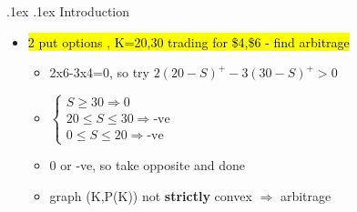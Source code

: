 \documentclass[10pt,landscape,a4paper]{article}
\makeatletter
\renewcommand{\section}{\@startsection{section}{1}{0mm}%
                                {.1ex}%
                                {.1ex}%
                                {\color{blue}\sffamily\small\bfseries}}
\makeatother
\begin{document}
\newcommand{\sucht}{\ \wasytherefore\ }

\pagecolor{light-gray}	
\normalsize

\begin{multicols*}{4}

\begin{spacing}{0.1}
	
\section{Introduction}
\begin{itemize}

\item \hl{2 put options , K=20,30 trading for \$4,\$6 - find arbitrage}
\begin{itemize}
	\item 2x6-3x4=0, so try  $2{(20-S)}^+ - 3{(30-S)}^+ > 0 $
	\item 
	$
	\begin{cases}
		S \ge 30 \Rightarrow 0 \\ 
		20 \le S \le 30 \Rightarrow \text{-ve} \\
		0 \le S \le 20 \Rightarrow \text{-ve}
	\end{cases}
	$
	\item 0 or -ve, so take opposite and done	
	\item graph (K,P(K)) not \textbf{strictly} convex $\Rightarrow$ arbitrage
	
	
\end{itemize}




\end{itemize}
\end{spacing}
\end{multicols*}
\end{document}
